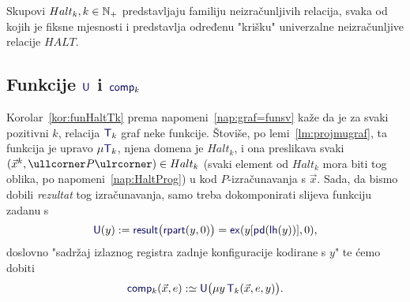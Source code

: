 Skupovi $Halt_k,k\in{\mathbb N}_+$ predstavljaju familiju neizračunljivih relacija, svaka od kojih je fiksne mjesnosti i predstavlja određenu "krišku" univerzalne neizračunljive relacije $HALT$.

\subsection{Funkcije \texorpdfstring{$\f U$ i $\f{comp}_k$}{U i comp}}

Korolar~\ref{kor:funHaltTk} prema napomeni~\ref{nap:graf=funsv} kaže da je za svaki pozitivni $k$, relacija $\f T_k$ graf neke funkcije. Štoviše, po lemi~\ref{lm:projmugraf}, ta funkcija je upravo $\mu\f T_k$, njena domena je $Halt_k$, i ona preslikava svaki $(\vec x^k,\kprog{P})\in Halt_k$ (svaki element od $Halt_k$ mora biti tog oblika, po napomeni~\ref{nap:HaltProg}) u kod $P$-izračunavanja s $\vec x$. Sada, da bismo dobili \emph{rezultat} tog izračunavanja, samo treba dokomponirati slijeva funkciju zadanu s
\begin{equation}\label{eq:Udef}
    \f U(y):=\f{result}\bigl(\f{rpart}(y,0)\bigr)=\f{ex}(y[\f{pd}(\f{lh}(y))],0)\text,
\end{equation}
doslovno "sadržaj izlaznog registra zadnje konfiguracije kodirane s $y$" te ćemo dobiti
\begin{equation}
    \f{comp}_k(\vec x,e):\simeq \f U\bigl(\mu y\,\f T_k(\vec x,e,y)\bigr)\text.
\end{equation}

